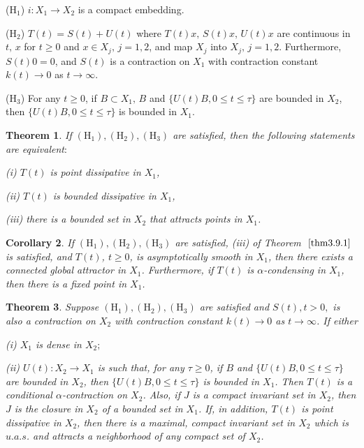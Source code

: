 \documentclass{surv-l}
\theoremstyle{plain}
\newtheorem{theorem}{Theorem}[section]
\newtheorem{corollary}[theorem]{Corollary}
\theoremstyle{definition}
\numberwithin{equation}{section}
\numberwithin{figure}{chapter}
\begin{document}
(H$_1$) $i\!:X_{1}\rightarrow X_{2}$ is a compact embedding.

(H$_2$) $T(t)=S(t)+U(t)$ where $T(t)x,\, S(t)x,\, U(t)x$ are continuous in $t,\, x$ for $t\geq 0$ and $x\in X_{j},\, j=1,2$, and map $X_{j}$ into $X_{j},\, j=1,2$. Furthermore, $S(t)0=0$, and $S(t)$ is a contraction on $X_{1}$ with contraction constant $k(t)\rightarrow 0$ as $ t\rightarrow\infty$.

(H$_3$) For any $t\geq 0$, if $B\subset X_{1},\, B$ and $\{U(t)B, 0\leq t\leq\tau\}$ are bounded in $X_{2}$, then $\{U(t)B, 0\leq t\leq\tau\}$ is bounded in $X_{1}$.

\begin{theorem}\label{thm3.9.1} If $(\mathrm{H}_{1}), (\mathrm{H}_{2}), (\mathrm{H}_{3})$ are satisfied, then the following statements are equivalent$:$

\emph{(i)} $T(t)$ is point dissipative in $X_{1}$,

\emph{(ii)} $T(t)$ is bounded dissipative in $X_{1}$,

\emph{(iii)} there is a bounded set in $X_{2}$ that attracts points in $X_{1}$.
\end{theorem}

\begin{corollary}\label{cor3.9.2} If $(\mathrm{H}_{1}), (\mathrm{H}_{2}), (\mathrm{H}_{3})$ are satisfied, \emph{(iii)} of Theorem $~\ref{thm3.9.1}$ is satisfied, and $T(t)$, $t\geq 0$, is asymptotically smooth in $X_{1}$, then there exists a connected global attractor in $X_{1}$. Furthermore, if $T(t)$ is $\alpha$-condensing in $X_{1}$, then there is a fixed point in $X_{1}$.
\end{corollary}

\begin{theorem}\label{thm3.9.3} Suppose $(\mathrm{H}_{1}), (\mathrm{H}_{2}), (\mathrm{H}_{3})$ are satisfied and $S(t), t>0,$ is also a contraction on $X_{2}$ with contraction constant $k(t)\rightarrow 0$ as $ t\rightarrow\infty$. If either

\emph{(i)} $X_{1}$ is dense in $X_{2};$

\emph{(ii)} $U(t)\!:X_{2}\rightarrow X_{1}$ is such that, for any $\tau\geq 0$, if $B$ and $\{U(t)B, 0\leq t\leq\tau\}$ are bounded in $X_{2}$, then $\{U(t)B, 0\leq t\leq\tau\}$ is bounded in $X_{1}$. Then $T(t)$ is a conditional $\alpha$-contraction on $X_{2}$. Also, if $J$ is a compact invariant set in $X_{2}$, then $J$ is the closure in $X_{2}$ of a bounded set in $X_{1}$. If, in addition, $T(t)$ is point dissipative in $X_{2}$, then there is a maximal, compact invariant set in $X_{2}$ which is $u.a.s$. and attracts a neighborhood of any compact set of $X_{2}$.
\end{theorem}
\end{document}
